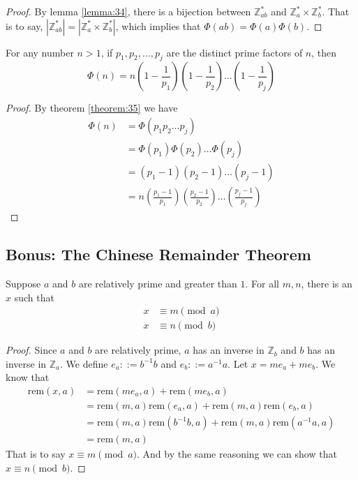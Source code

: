 \documentclass[11pt]{article}
\newcommand{\Zs}{\mathbb{Z}^\ast}
\newcommand{\rem}{\mathrm{rem}}
\begin{document}
\begin{proof}
By lemma \ref{lemma:34}, there is a bijection between $\Zs_{ab}$ and $\Zs_a \times \Zs_b$. That is to say, $|\Zs_{ab}|=|\Zs_a \times \Zs_b|$, which implies that
$\Phi(ab)=\Phi(a)\Phi(b)$.
\end{proof}

\begin{corollary}
For any number $n > 1$, if $p_1,p_2,\dots,p_j$ are the distinct prime factors of $n$, then
\[
  \Phi(n)=n\left(1-\frac{1}{p_1}\right)\left(1-\frac{1}{p_2}\right)\dots\left(1-
  \frac{1}{p_j}\right)
\]
\end{corollary}

\begin{proof}
By theorem \ref{theorem:35} we have
\begin{align*}
\Phi(n) &= \Phi(p_1p_2 \dots p_j) \\
&= \Phi(p_1)\Phi(p_2)\dots\Phi(p_j) \\
&= (p_1-1)(p_2-1)\dots(p_j-1) \\
&= n\left(\frac{p_1-1}{p_1}\right)\left(\frac{p_2-1}{p_2}\right)\dots\left(
\frac{p_j-1}{p_j}\right)
\end{align*}

\end{proof}

\subsection{Bonus: The Chinese Remainder Theorem}

\begin{lemma} \label{lemma:2.8.1}
Suppose $a$ and $b$ are relatively prime and greater than $1$. For all $m,n$, there is an
$x$ such that
\begin{align*}
x &\equiv m \pmod{a} \\
x &\equiv n \pmod{b}
\end{align*}
\end{lemma}

\begin{proof}
Since $a$ and $b$ are relatively prime, $a$ has an inverse in $\mathbb{Z}_b$ and $b$ has an
inverse in $\mathbb{Z}_a$. We define $e_a ::= b^{-1}b$ and $e_b ::= a^{-1}a$. Let
$x = me_a + me_b$. We know that
\begin{align*}
\rem(x,a) &= \rem(me_a,a) + \rem(me_b,a) \\
&=\rem(m,a)\rem(e_a,a) + \rem(m,a)\rem(e_b,a) \\
&=\rem(m,a)\rem(b^{-1}b,a) + \rem(m,a)\rem(a^{-1}a,a) \\
&=\rem(m,a)
\end{align*}
That is to say $x \equiv m \pmod{a}$. And by the same reasoning we can show that
$x \equiv n \pmod{b}$.
\end{proof}
\end{document}
